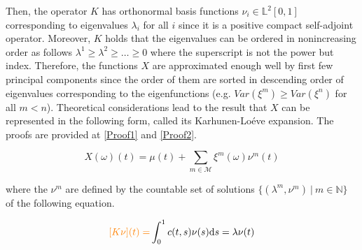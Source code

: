 \documentclass[11pt,twoside,a4paper]{article}
\begin{document}
	Then, the operator $K$ has orthonormal basis functions $\nu_{i} \in \mathbb{L}^{2}[0,1]$ corresponding to eigenvalues $\lambda_{i}$ for all $i$ since it is a positive compact self-adjoint operator. Moreover, $K$ holds that the eigenvalues can be ordered in nonincreasing order as follows $\lambda^{1} \geq \lambda^{2} \geq \dots \geq 0$ where the superscript is not the power but index. Therefore, the functions $X$ are approximated enough well by first few principal components since the order of them are sorted in descending order of eigenvalues corresponding to the eigenfunctions (e.g. $Var(\xi^{m}) \geq Var(\xi^{n})$ for all $m < n$). Theoretical considerations lead to the result that $X$ can be represented in the following form, called its Karhunen-Lo\'{e}ve expansion. The proofs are provided at \ref{Proof1} and \ref{Proof2}.
	
	
	\begin{equation}\label{KarhunenLoeve}
		X(\omega)(t) = \mu(t) + \sum_{m \in \mathcal{M}} \xi^m(\omega) \nu^m(t)
	\end{equation}
	
	where the $\nu^m$ are defined by the countable set of solutions $\{(\lambda^m, \nu^m) \: \vert \: m \in \mathbb{N}\}$ of the following equation.
	
	\begin{equation}
		{\color{orange} [K \nu](t) =}\int_{0}^{1}c(t,s)\nu(s) \mathrm{d}s = \lambda \nu(t)
	\end{equation}
	
\end{document}
